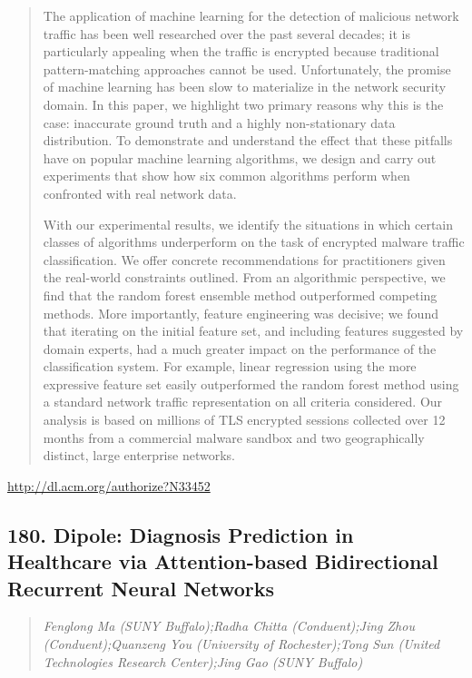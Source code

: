 \documentclass{article}
\begin{document}
\begin{quote}
The application of machine learning for the detection of malicious network traffic has been well researched over the past several decades; it is particularly appealing when the traffic is encrypted because traditional pattern-matching approaches cannot be used. Unfortunately, the promise of machine learning has been slow to materialize in the network security domain. In this paper, we highlight two primary reasons why this is the case: inaccurate ground truth and a highly non-stationary data distribution. To demonstrate and understand the effect that these pitfalls have on popular machine learning algorithms, we design and carry out experiments that show how six common algorithms perform when confronted with real network data.







  With our experimental results, we identify the situations in which certain classes of algorithms underperform on the task of encrypted malware traffic classification. We offer concrete recommendations for practitioners given the real-world constraints outlined. From an algorithmic perspective, we find that the random forest ensemble method outperformed competing methods. More importantly, feature engineering was decisive; we found that iterating on the initial feature set, and including features suggested by domain experts, had a much greater impact on the performance of the classification system. For example, linear regression using the more expressive feature set easily outperformed the random forest method using a standard network traffic representation on all criteria considered. Our analysis is based on millions of TLS encrypted sessions collected over 12 months from a commercial malware sandbox and two geographically distinct, large enterprise networks.
\end{quote}

\href{http://dl.acm.org/authorize?N33452}{http://dl.acm.org/authorize?N33452}

\subsection{180. Dipole: Diagnosis Prediction in Healthcare via Attention-based Bidirectional Recurrent Neural Networks}

\begin{quote}
\footnotesize{\textit{Fenglong Ma (SUNY Buffalo);Radha Chitta (Conduent);Jing Zhou (Conduent);Quanzeng You (University of Rochester);Tong Sun (United Technologies Research Center);Jing Gao (SUNY Buffalo)}}

\end{quote}
\end{document}
